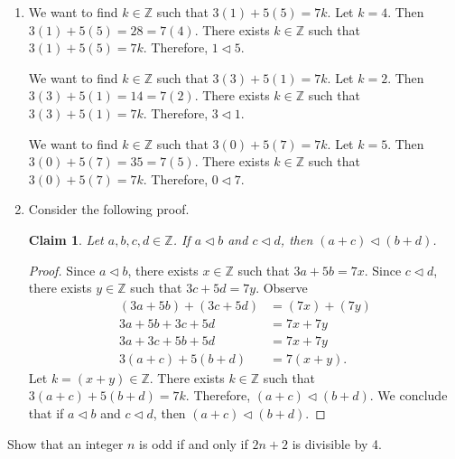 \documentclass{article}
\newtheorem*{claim}{Claim}
\theoremstyle{definition}
\begin{document}
\begin{solution}
\begin{enumerate}
\item We want to find $k\in\mathbb{Z}$ such that $3(1)+5(5)=7k$. Let $k=4$. Then $3(1)+5(5)=28=7(4)$. There exists $k\in\mathbb{Z}$ such that $3(1)+5(5)=7k$. Therefore, $1\triangleleft 5$.

We want to find $k\in\mathbb{Z}$ such that $3(3)+5(1)=7k$. Let $k=2$. Then $3(3)+5(1)=14=7(2)$. There exists $k\in\mathbb{Z}$ such that $3(3)+5(1)=7k$. Therefore, $3\triangleleft 1$.

We want to find $k\in\mathbb{Z}$ such that $3(0)+5(7)=7k$. Let $k=5$. Then $3(0)+5(7)=35=7(5)$. There exists $k\in\mathbb{Z}$ such that $3(0)+5(7)=7k$. Therefore, $0\triangleleft 7$.
\item Consider the following proof.\begin{claim}
Let $a,b,c,d\in\mathbb{Z}$. If $a\triangleleft b$ and $c\triangleleft d$, then $(a+c)\triangleleft(b+d)$.
\end{claim}\begin{proof}
Since $a\triangleleft b$, there exists $x\in\mathbb{Z}$ such that $3a+5b=7x$. Since $c\triangleleft d$, there exists $y\in\mathbb{Z}$ such that $3c+5d=7y$. Observe
\begin{align*}
(3a+5b)+(3c+5d)&=(7x)+(7y)\\
3a+5b+3c+5d&=7x+7y\\
3a+3c+5b+5d&=7x+7y\\
3(a+c)+5(b+d)&=7(x+y).
\end{align*}
Let $k=(x+y)\in\mathbb{Z}$. There exists $k\in\mathbb{Z}$ such that $3(a+c)+5(b+d)=7k$. Therefore, $(a+c)\triangleleft(b+d)$. We conclude that if $a\triangleleft b$ and $c\triangleleft d$, then $(a+c)\triangleleft(b+d)$.
\end{proof}
\end{enumerate}
\end{solution}
\begin{question}
    Show that an integer $n$ is odd if and only if $2n+2$ is divisible by 4.
\end{question}
\end{document}
